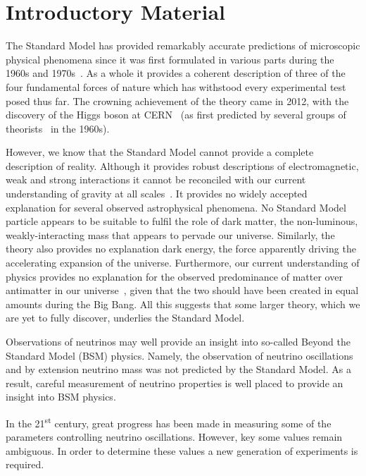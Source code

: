 \chapter{Introductory Material}
\label{sec:intro}

The Standard Model has provided remarkably accurate predictions of microscopic physical phenomena since it was first formulated in various parts during the 1960s and 1970s~\cite{glashow1961, weinberg1967, qcdTheory1, qcdTheory2}.
As a whole it provides a coherent description of three of the four fundamental forces of nature which has withstood every experimental test posed thus far. 
The crowning achievement of the theory came in 2012, with the discovery of the Higgs boson at CERN~\cite{higgsDiscoveryATLAS, higgsDiscoveryCMS} (as first predicted by several groups of theorists~\cite{higgsTheory1, higgsTheory2, higgsTheory3} in the 1960s).

However, we know that the Standard Model cannot provide a complete description of reality.
Although it provides robust descriptions of electromagnetic, weak and strong interactions it cannot be reconciled with our current understanding of gravity at all scales~\cite{quantumGravity}.
It provides no widely accepted explanation for several observed astrophysical phenomena.
No Standard Model particle appears to be suitable to fulfil the role of dark matter, the non-luminous, weakly-interacting mass that appears to pervade our universe.
Similarly, the theory also provides no explanation dark energy, the force apparently driving the accelerating expansion of the universe.
Furthermore, our current understanding of physics provides no explanation for the observed predominance of matter over antimatter in our universe~\cite{matterAntimatterAMS}, given that the two should have been created in equal amounts during the Big Bang.
All this suggests that some larger theory, which we are yet to fully discover, underlies the Standard Model.

Observations of neutrinos may well provide an insight into so-called Beyond the Standard Model (BSM) physics.
Namely, the observation of neutrino oscillations~\cite{SNO, superK} and by extension neutrino mass was not predicted by the Standard Model.
As a result, careful measurement of neutrino properties is well placed to provide an insight into BSM physics.

In the 21\textsuperscript{st} century, great progress has been made in measuring some of the parameters controlling neutrino oscillations.
However, key some values remain ambiguous.
In order to determine these values a new generation of experiments is required.

